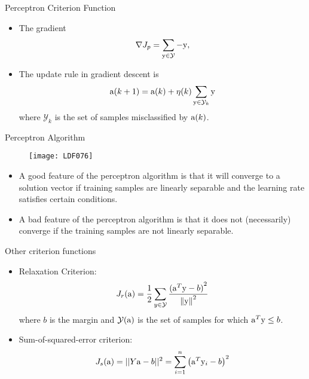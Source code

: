 \begin{frame}{Perceptron Criterion Function}
\begin{itemize}
\item The gradient
\[\nabla {J_p} = \sum\limits_{{\rm y} \in \mathcal{Y}} { - {{\rm y}}}, \]
\item The update rule in gradient descent is 
\[{{\rm a}}(k + 1) = {{\rm a}}(k) + \eta (k)\sum\limits_{{\rm y} \in \mathcal{Y}_k} {{\rm y}} \]
where $\mathcal{Y}_k$ is the set of samples misclassified by ${\rm a}(k)$.
\end{itemize}
\end{frame}

\begin{frame}{Perceptron Algorithm}
\begin{figure}
\texttt{[image: LDF076]}
\end{figure}
\vspace{-12pt}
\begin{itemize}
\item A good feature of the perceptron algorithm is that it will converge to a solution vector if training samples are linearly separable and the learning rate satisfies certain conditions.
\item A bad feature of the perceptron algorithm is that it does not (necessarily) converge if the training samples are not linearly separable.
\end{itemize}
\end{frame}

\begin{frame}{Other criterion functions}
\begin{itemize}
\item Relaxation Criterion:
\[{J_r}({\rm a}) = \frac{1}{2}\sum\limits_{y \in \mathcal{Y}} {\frac{{{{({{\rm a}^T}{\rm y} - b)}^2}}}{{{{\left\| {\rm y} \right\|}^2}}}} \]
where $b$ is the margin and $\mathcal{Y}({\rm a})$ is the set of samples for which ${\rm a}^T{\rm y}\leq b$.
\item Sum-of-squared-error criterion:
\[{J_s}({\rm a}) =||Y{\rm a}-b||^2= \sum\limits_{i = 1}^n {{{\left( {{{\rm a}^T}{{\rm y}_i} - b} \right)}^2}} \]
\end{itemize}
\end{frame}

